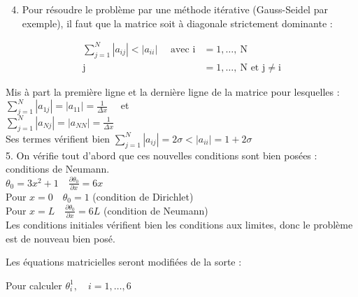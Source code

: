 \documentclass[10pt]{article}
\begin{document}
\begin{enumerate}
  \setcounter{enumi}{3}
  \item Pour résoudre le problème par une méthode itérative (Gauss-Seidel par exemple), il faut que la matrice soit à diagonale strictement dominante :
\end{enumerate}

\[
\begin{aligned}
\sum_{j=1}^{N}\left|a_{i j}\right|<\left|a_{i i}\right| \quad \text { avec } \mathrm{i} & =1, \ldots, \mathrm{~N} \\
\mathrm{j} & =1, \ldots, \mathrm{~N} \text { et } \mathrm{j} \neq \mathrm{i}
\end{aligned}
\]

Mis à part la première ligne et la dernière ligne de la matrice pour lesquelles :\\
\(\sum_{j=1}^{N}\left|a_{1 j}\right|=\left|a_{11}\right|=\frac{1}{\Delta x} \quad\) et\\
\(\sum_{j=1}^{N}\left|a_{N j}\right|=\left|a_{N N}\right|=\frac{1}{\Delta x}\)\\
Ses termes vérifient bien \(\sum_{j=1}^{N}\left|a_{i j}\right|=2 \sigma<\left|a_{i i}\right|=1+2 \sigma\)\\
5. On vérifie tout d'abord que ces nouvelles conditions sont bien posées : conditions de Neumann.\\
\(\theta_{0}=3 x^{2}+1 \quad \frac{\partial \theta_{0}}{\partial x}=6 x\)\\
Pour \(x=0 \quad \theta_{0}=1\) (condition de Dirichlet)\\
Pour \(x=L \quad \frac{\partial \theta_{0}}{\partial x}=6 L\) (condition de Neumann)\\
Les conditions initiales vérifient bien les conditions aux limites, donc le problème est de nouveau bien posé.

Les équations matricielles seront modifiées de la sorte :

Pour calculer \(\theta_{i}^{1}, \quad i=1, \ldots, 6\)
\end{document}

